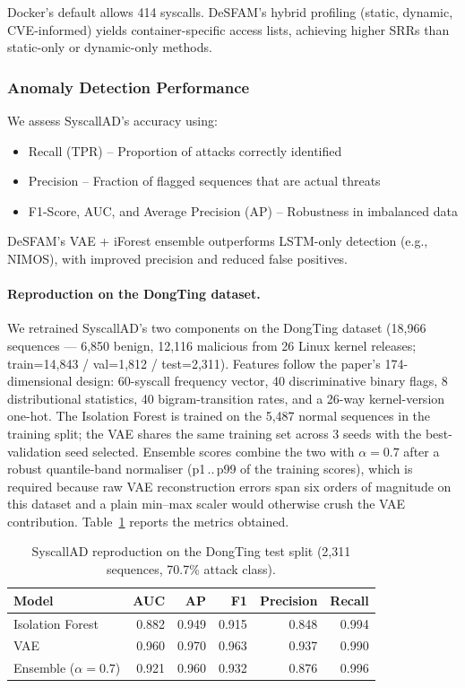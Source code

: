 Docker's default allows 414 syscalls. DeSFAM's hybrid profiling (static, dynamic,
CVE-informed) yields container-specific access lists, achieving higher SRRs than static-only or
dynamic-only methods.

\subsubsection{Anomaly Detection Performance}
We assess SyscallAD's accuracy using:
\begin{itemize}
  \item Recall (TPR) -- Proportion of attacks correctly identified
  \item Precision -- Fraction of flagged sequences that are actual threats
  \item F1-Score, AUC, and Average Precision (AP) -- Robustness in imbalanced data
\end{itemize}
DeSFAM's VAE + iForest ensemble outperforms LSTM-only detection (e.g., NIMOS), with improved
precision and reduced false positives.

\paragraph{Reproduction on the DongTing dataset.}
We retrained SyscallAD's two components on the DongTing dataset
(18{,}966 sequences --- 6{,}850 benign, 12{,}116 malicious from 26 Linux
kernel releases; train=14{,}843 / val=1{,}812 / test=2{,}311). Features
follow the paper's 174-dimensional design: 60-syscall frequency vector,
40 discriminative binary flags, 8 distributional statistics, 40
bigram-transition rates, and a 26-way kernel-version one-hot. The
Isolation Forest is trained on the 5{,}487 normal sequences in the
training split; the VAE shares the same training set across 3 seeds with
the best-validation seed selected. Ensemble scores combine the two with
$\alpha = 0.7$ after a robust quantile-band normaliser (p1\,..\,p99 of
the training scores), which is required because raw VAE reconstruction
errors span six orders of magnitude on this dataset and a plain min--max
scaler would otherwise crush the VAE contribution. Table~\ref{tab:dongting_reproduction}
reports the metrics obtained.

\begin{table}[!t]
\centering
\caption{SyscallAD reproduction on the DongTing test split
(2{,}311 sequences, 70.7\% attack class).}
\label{tab:dongting_reproduction}
\begin{tabular}{lrrrrr}
\toprule
Model & AUC & AP & F1 & Precision & Recall \\
\midrule
Isolation Forest & 0.882 & 0.949 & 0.915 & 0.848 & 0.994 \\
VAE              & 0.960 & 0.970 & 0.963 & 0.937 & 0.990 \\
Ensemble ($\alpha{=}0.7$) & 0.921 & 0.960 & 0.932 & 0.876 & 0.996 \\
\bottomrule
\end{tabular}
\end{table}


